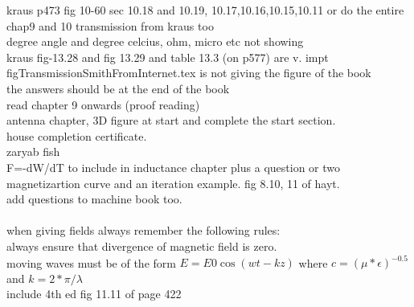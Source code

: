 \begin{otherlanguage}{english}
kraus p473 fig 10-60 sec 10.18 and 10.19, 10.17,10.16,10.15,10.11 or do the entire chap9 and 10  transmission from kraus too\\
degree angle and degree celcius, ohm, micro etc not showing\\
kraus fig-13.28 and fig 13.29 and table 13.3 (on p577) are v. impt\\
figTransmissionSmithFromInternet.tex is not giving the figure of the book\\
the answers should be at the end of the book\\
read chapter 9 onwards (proof reading)\\
antenna chapter, 3D figure at start and complete the start section.\\
house completion certificate.\\
zaryab fish\\
F=-dW/dT to include in inductance chapter plus a question or two\\
magnetizartion curve and an iteration example. fig 8.10, 11 of hayt.\\
add questions to machine book too.\\
\\
when giving fields always remember the following rules:\\
always ensure that divergence of magnetic field is zero.\\
moving waves must be of the form $E=E0 \cos(wt-kz)$ where $c=(\mu*\epsilon)^{-0.5}$ and $k=2*\pi/\lambda$\\
include 4th ed fig 11.11 of page 422
\end{otherlanguage}
